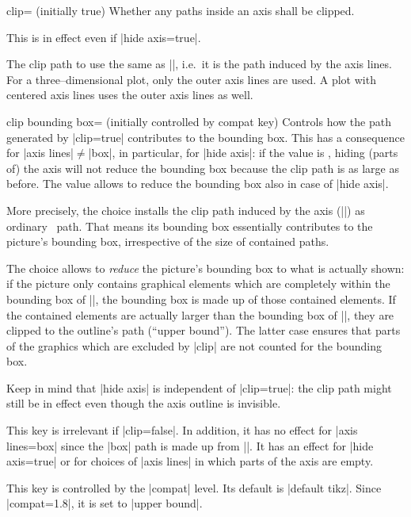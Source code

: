 \begin{pgfplotskey}{clip= (initially true)}
	Whether any paths inside an axis shall be clipped.

	This is in effect even if |hide axis=true|. 

	The clip path to use the same as |\pgfplotspathaxisoutline|, i.e.\ it is the path induced by the axis lines. For a three--dimensional plot, only the outer axis lines are used. A plot with centered axis lines uses the outer axis lines as well.
\end{pgfplotskey}

\begin{pgfplotskey}{clip bounding box= (initially controlled by compat key)}
	Controls how the path generated by |clip=true| contributes to the bounding box. This has a consequence for |axis lines|$\neq$|box|, in particular, for |hide axis|: if the value is , hiding (parts of) the axis will not reduce the bounding box because the clip path is as large as before. The value  allows to reduce the bounding box also in case of |hide axis|. 

	More precisely, the choice  installs the clip path induced by the axis (|\pgfplotspathaxisoutline|) as ordinary \tikzname\ path. That means its bounding box essentially contributes to the picture's bounding box, irrespective of the size of contained paths.

	The choice  allows to \emph{reduce} the picture's bounding box to what is actually shown: if the picture only contains graphical elements which are completely within the bounding box of |\pgfplotspathaxisoutline|, the bounding box is made up of those contained elements. If the contained elements are actually larger than the bounding box of |\pgfplotspathaxisoutline|, they are clipped to the outline's path (``upper bound''). The latter case ensures that parts of the graphics which are excluded by |clip| are not counted for the bounding box.

	Keep in mind that |hide axis| is independent of |clip=true|: the clip path might still be in effect even though the axis outline is invisible.

	This key is irrelevant if |clip=false|. In addition, it has no effect for |axis lines=box| since the |box| path is made up from |\pgfplotspathaxisoutline|. It has an effect for |hide axis=true| or for choices of |axis lines| in which parts of the axis are empty. 

	This key is controlled by the |compat| level. Its default is |default tikz|. Since |compat=1.8|, it is set to |upper bound|.
\end{pgfplotskey}

